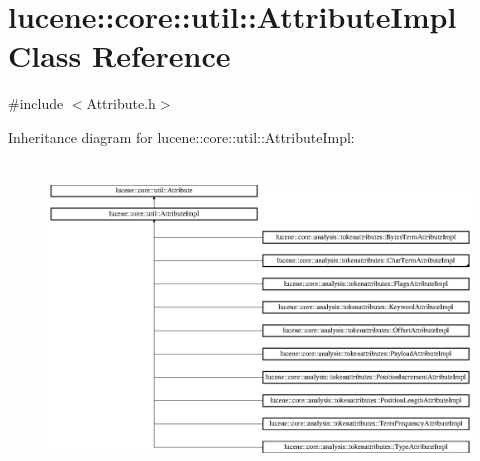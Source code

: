 \hypertarget{classlucene_1_1core_1_1util_1_1AttributeImpl}{}\section{lucene\+:\+:core\+:\+:util\+:\+:Attribute\+Impl Class Reference}
\label{classlucene_1_1core_1_1util_1_1AttributeImpl}


{\ttfamily \#include $<$Attribute.\+h$>$}

Inheritance diagram for lucene\+:\+:core\+:\+:util\+:\+:Attribute\+Impl\+:\begin{figure}[H]
\begin{center}
\leavevmode
\includegraphics[height=8.337469cm]{classlucene_1_1core_1_1util_1_1AttributeImpl}
\end{center}
\end{figure}
